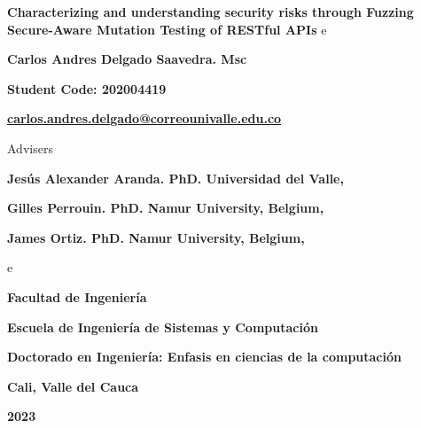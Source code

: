 
\begin{titlepage}
\begin{comment}

		\begin{center}
			{\bf Characterizing and understanding security risks through Fuzzing Secure-Aware Mutation Testing of RESTful-API}
			\vfill
			{\bf Carlos Andres Delgado Saavedra. Msc \par}
			{\bf Código: 2004419 \par}
			{\bf carlos.andres.delgado@correounivalle.edu.co }
			\vfill
			{\bf Facultad de Ingeniería \par}
			{\bf Escuela de Ingeniería de Sistemas y Computación \par}
			{\bf Doctorado en Ingeniería: Enfasis en ciencias de la computación\par}
			{\bf Cali, Valle del Cauca \par}
			{\bf 2023 \par}
    \end{center}
\newpage
\end{comment}
	\begin{center}
			{\bf Characterizing and understanding security risks through Fuzzing Secure-Aware Mutation Testing of RESTful APIs}
			\vfill e
			{\bf Carlos Andres Delgado Saavedra. Msc \par}
			{\bf Student Code: 202004419 \par}
			{\bf \href{mailto:carlos.andres.delgado@correounivalle.edu.co}{carlos.andres.delgado@correounivalle.edu.co }}
			\vfill

		{Advisers \par}
		{\bf Jesús Alexander Aranda. PhD. Universidad del Valle, \par}
		{\bf Gilles Perrouin. PhD. Namur University, Belgium, \par}
         {\bf James Ortiz. PhD. Namur University, Belgium, \par}
			\vfill e
			{\bf Facultad de Ingeniería \par}
			{\bf Escuela de Ingeniería de Sistemas y Computación \par}
			{\bf Doctorado en Ingeniería: Enfasis en ciencias de la computación\par}
			{\bf Cali, Valle del Cauca \par}
			{\bf 2023 \par}
    \end{center}
\end{titlepage}
